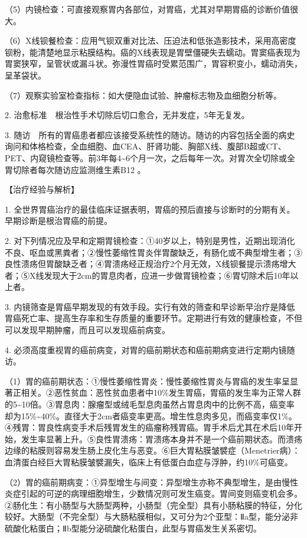 （5）内镜检查：可直接观察胃内各部位，对胃癌，尤其对早期胃癌的诊断价值很大。

（6）X线钡餐检查：应用气钡双重对比法、压迫法和低张造影技术，采用高密度钡粉，能清楚地显示粘膜结构。癌的X线表现是胃壁僵硬失去蠕动。胃窦癌表现为胃窦狭窄，呈管状或漏斗状。弥漫性胃癌时受累范围广，胃容积变小，蠕动消失，呈革袋状。

（7）观察实验室检查指标：如大便隐血试验、肿瘤标志物及血细胞分析等。

2. 治愈标准　根治性手术切除后切口愈合，无并发症，5年无复发。

3.
随访　所有的胃癌患者都应该接受系统性的随访。随访的内容包括全面的病史询问和体格检查，全血细胞、血CEA、肝肾功能、胸部X线、腹部B超或CT、PET、内窥镜检查等。前3年每4\textasciitilde{}6个月一次，之后每年一次。对胃次全切除或全胃切除者每次随访应监测维生素B{12}
。

【治疗经验与解析】

1.
全世界胃癌治疗的最佳临床证据表明，胃癌的预后直接与诊断时的分期有关。早期诊断是根治胃癌的前提。

2.
对下列情况应及早和定期胃镜检查：①40岁以上，特别是男性，近期出现消化不良、呕血或黑粪者；②慢性萎缩性胃炎伴胃酸缺乏，有肠化或不典型增生者；③良性溃疡但胃酸缺乏者；④胃溃疡经正规治疗2个月无效，X线钡餐提示溃疡增大者；⑤X线发现大于2cm的胃息肉者，应进一步做胃镜检查；⑥胃切除术后10年以上者。

3.
内镜筛查是胃癌早期发现的有效手段。实行有效的筛查和早诊断早治疗是降低胃癌死亡率、提高生存率和生存质量的重要环节。定期进行有效的健康检查，不但可以发现早期肿瘤，而且可以发现癌前病变。

4.
必须高度重视胃的癌前病变，对胃的癌前期状态和癌前期病变进行定期内镜随访。

（1）胃的癌前期状态：①慢性萎缩性胃炎：慢性萎缩性胃炎与胃癌的发生率呈显著正相关。②恶性贫血：恶性贫血患者中10\%发生胃癌，胃癌的发生率为正常人群的5\textasciitilde{}10倍。③胃息肉：腺瘤型或绒毛型息肉虽然占胃息肉中的比例不高，癌变率却为15\%\textasciitilde{}40\%。直径大于2cm者癌变率更高。增生性息肉多见，而癌变率仅1\%。④残胃：胃良性病变手术后残胃发生的癌瘤称残胃癌。胃手术后尤其在术后10年开始，发生率显著上升。⑤良性胃溃疡：胃溃疡本身并不是一个癌前期状态。而溃疡边缘的粘膜则容易发生肠上皮化生与恶变。⑥巨大胃粘膜皱襞症（Menetrier病）：血清蛋白经巨大胃粘膜皱襞漏失，临床上有低蛋白血症与浮肿，约10\%可癌变。

（2）胃的癌前期病变：①异型增生与间变：异型增生亦称不典型增生，是由慢性炎症引起的可逆的病理细胞增生，少数情况则可发生癌变。胃间变则癌变机会多。②肠化生：有小肠型与大肠型两种，小肠型（完全型）具有小肠粘膜的特征，分化较好。大肠型（不完全型）与大肠粘膜相似，又可分为2个亚型：Ⅱa型，能分泌非硫酸化粘蛋白；Ⅱb型能分泌硫酸化粘蛋白，此型与胃癌发生关系密切。

